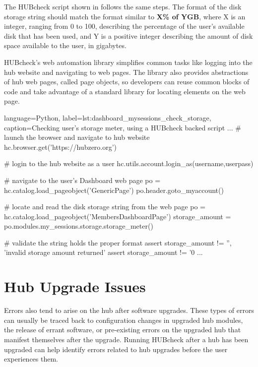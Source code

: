 The HUBcheck script shown in
 follows the same steps.  The
format of the disk storage string should match the format similar to
\textbf{X\% of YGB}, where X is an integer, ranging from 0 to 100, describing
the percentage of the user's available disk that has been used, and Y is a
positive integer describing the amount of disk space available to the user, in
gigabytes.

HUBcheck's web automation library simplifies common tasks like logging into the
hub website and navigating to web pages. The library also provides abstractions
of hub web pages, called page objects, so developers can reuse common blocks of
code and take advantage of a standard library for locating elements on the web
page.


\begin{xcode}{%
  language=Python,%
  label=lst:dashboard_mysessions_check_storage,%
  caption={Checking user's storage meter, using a HUBcheck backed script} %
}
...
# launch the browser and navigate to hub website
hc.browser.get('https://hubzero.org')

# login to the hub website as a user
hc.utils.account.login_as(username,userpass)

# navigate to the user's Dashboard web page
po = hc.catalog.load_pageobject('GenericPage')
po.header.goto_myaccount()

# locate and read the disk storage string from the web page
po = hc.catalog.load_pageobject('MembersDashboardPage')
storage_amount = po.modules.my_sessions.storage.storage_meter()

# validate the string holds the proper format
assert storage_amount != '', 'invalid storage amount returned'
assert storage_amount != '0%
...
\end{xcode}


\section{Hub Upgrade Issues}
\label{sec:problem_upgrade}

Errors also tend to arise on the hub after software upgrades.  These types of
errors can usually be traced back to configuration changes in upgraded hub
modules, the release of errant software, or pre-existing errors on the upgraded
hub that manifest themselves after the upgrade. Running HUBcheck after a hub
has been upgraded can help identify errors related to hub upgrades before the
user experiences them.

